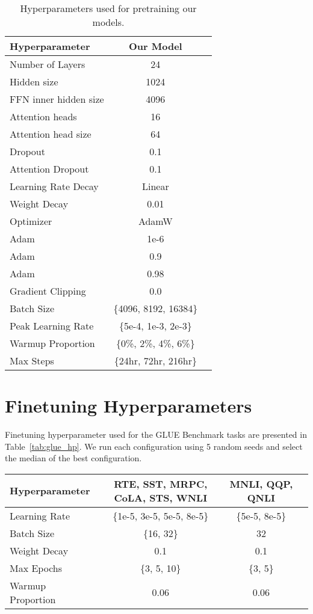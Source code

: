 \documentclass[11pt]{article}
\begin{document}
\begin{table}[t]
\centering
\small
\begin{tabular}{@{}lcc@{}}
\toprule
\bf Hyperparameter  & \bf Our Model \\
\midrule 
Number of Layers & 24 \\
Hidden size & 1024 \\
FFN inner hidden size & 4096 \\
Attention heads & 16 \\
Attention head size & 64 \\
Dropout & 0.1 \\
Attention Dropout & 0.1 \\
Learning Rate Decay & Linear \\
Weight Decay & 0.01 \\
Optimizer & AdamW \\
Adam  & 1e-6 \\
Adam  & 0.9 \\
Adam  & 0.98 \\
Gradient Clipping & 0.0 \\ \midrule
Batch Size & \{4096, 8192, 16384\} \\
Peak Learning Rate & \{5e-4, 1e-3, 2e-3\} \\
Warmup Proportion & \{0\%, 2\%, 4\%, 6\%\} \\
Max Steps & \{24hr, 72hr, 216hr\} \\
\bottomrule
\end{tabular}
\caption{
Hyperparameters used for pretraining our models.
}
\label{tab:pretrain_hp}
\end{table}
 

\section{Finetuning Hyperparameters}
\label{appendix:b}
Finetuning hyperparameter used for the GLUE Benchmark tasks are presented in Table~\ref{tab:glue_hp}. We run each configuration using 5 random seeds and select the median of the best configuration.

\begin{table*}[t]
\centering
\small
\begin{tabular}{@{}lccc@{}}
\toprule
\bf Hyperparameter  & \bf RTE, SST, MRPC, CoLA, STS, WNLI & \bf MNLI, QQP, QNLI \\
\midrule 
Learning Rate & \{1e-5, 3e-5, 5e-5, 8e-5\} & \{5e-5, 8e-5\}\\
Batch Size & \{16, 32\} & 32\\
Weight Decay & 0.1 & 0.1 \\
Max Epochs & \{3, 5, 10\} & \{3, 5\} \\
Warmup Proportion & 0.06 & 0.06 \\
\bottomrule
\end{tabular}
\caption{
The hyperparameter space used for finetuning our model on GLUE benchmark tasks.
}
\label{tab:glue_hp}
\end{table*}
 
\end{document}
